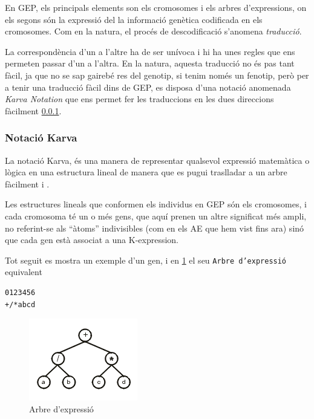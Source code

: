 En GEP, els principals elements son els cromosomes i els arbres d'expressions,
on els segons són la expressió del la informació genètica codificada en els
cromosomes.  Com en la natura, el procés de descodificació s'anomena
\emph{traducció}.

La correspondència d'un a l'altre ha de ser unívoca i hi ha unes regles que ens
permeten passar d'un a l'altra.  En la natura, aquesta traducció no és pas tant
fàcil, ja que no se sap gairebé res del genotip, si tenim només un fenotip, però
per a tenir una traducció fàcil dins de GEP, es disposa d'una notació anomenada
\emph{Karva Notation} que ens permet fer les traduccions en les dues direccions
fàcilment \ref{ssub:Notacio Karva}.



\subsubsection{Notació Karva} %
\label{ssub:Notacio Karva}

La notació Karva, és una manera de representar qualsevol expressió matemàtica o
lògica en una estructura lineal de manera que es pugui traslladar a un arbre
fàcilment \cite{ferreira:2001} i \cite{ferreira:2006}.

Les estructures lineals que conformen els individus en GEP són els cromosomes,
i cada cromosoma té un o més gens, que aquí prenen un altre significat més
ampli, no referint-se als ``àtoms'' indivisibles (com en els AE que hem vist
fins ara) sinó que cada gen està associat a una K-expression.
\cite{ferreira:2007}

Tot seguit es mostra un exemple d'un gen, i en \ref{fig:expression tree1} el seu
\texttt{Arbre d'expressió} equivalent

\begin{verbatim}
0123456    
+/*abcd
\end{verbatim}

\begin{figure}[h]
\begin{center}
\includegraphics{intro/et1.png}
\end{center}
\caption{Arbre d'expressió}
\label{fig:expression tree1}
\end{figure}

